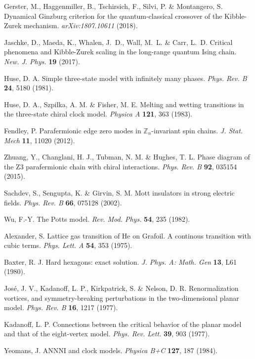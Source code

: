 \documentclass[prl,nobalancelastpage,superscriptaddress,twocolumn,nofootinbib]{revtex4}
\begin{document}
\begin{thebibliography}{}
 Gerster, M., Haggenmiller, B., Tschirsich, F., Silvi, P. \& Montangero, S. Dynamical Ginzburg criterion for the quantum-classical crossover of the Kibble-Zurek mechanism. \emph{arXiv:1807.10611} (2018).

 Jaschke, D., Maeda, K., Whalen, J.~D., Wall, M.~L. \& Carr, L.~D. Critical phenomena and {K}ibble-{Z}urek scaling in the long-range quantum {I}sing chain. \emph{New. J. Phys.} \textbf{19} (2017).

 Huse, D. A. Simple three-state model with infinitely many phases. \emph{Phys. Rev. B} \textbf{24}, 5180 (1981).

 Huse, D. A., Szpilka, A. M. \& Fisher, M. E. Melting and wetting transitions in the three-state chiral clock model. \emph{Physica A} \textbf{121}, 363 (1983).

 Fendley, P. Parafermionic edge zero modes in $\mathbb{Z}_n$-invariant spin chains. \emph{J. Stat. Mech} \textbf{11}, 11020 (2012).

 Zhuang, Y., Changlani, H. J., Tubman, N. M. \& Hughes, T. L. Phase diagram of the Z3 parafermionic chain with chiral interactions. \emph{Phys. Rev. B} \textbf{92}, 035154 (2015).

 Sachdev, S., Sengupta, K. \& Girvin, S. M. Mott insulators in strong electric fields. \emph{Phys. Rev. B} \textbf{66}, 075128 (2002).

 Wu, F.-Y. The Potts model. \emph{Rev. Mod. Phys.} \textbf{54}, 235 (1982).

 Alexander, S. Lattice gas transition of He on Grafoil. A continous transition with cubic terms. \emph{Phys. Lett. A} \textbf{54}, 353 (1975).

 Baxter, R. J. Hard hexagons: exact solution. \emph{J. Phys. A: Math. Gen} \textbf{13}, L61 (1980).

 Jos\'e, J. V., Kadanoff, L. P., Kirkpatrick, S. \& Nelson, D. R. Renormalization vortices, and symmetry-breaking perturbations in the two-dimensional planar model. \emph{Phys. Rev. B} \textbf{16}, 1217 (1977).

 Kadanoff, L. P. Connections between the critical behavior of the planar model and that of the eight-vertex model. \emph{Phys. Rev. Lett.} \textbf{39}, 903 (1977).

 Yeomans, J. ANNNI and clock models. \emph{Physica B+C} \textbf{127}, 187 (1984).

\end{thebibliography}
\end{document}
